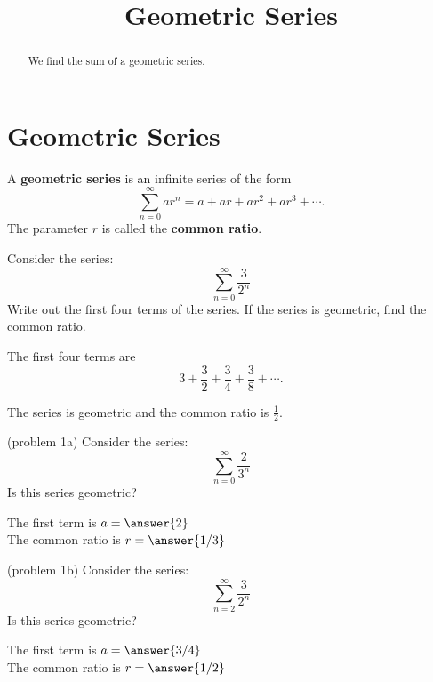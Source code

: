 \documentclass{ximera}
\title{Geometric Series}
\begin{document}
\begin{abstract}
We find the sum of a geometric series.
\end{abstract}

\maketitle

\section{Geometric Series}

\begin{definition} A \textbf{geometric series} is an infinite series of the form
\[
\sum_{n=0}^\infty ar^n = a + ar + ar^2 + ar^3 + \cdots.
\]
The parameter $r$ is called the \textbf{common ratio}.
\end{definition}

\begin{example}[example 1]
Consider the series:
\[
 \sum_{n=0}^\infty \frac{3}{2^n} 
 \]
 Write out the first four terms of the series. If the series is geometric, find the common ratio.
 
 The first four terms are \[
 3 + \frac32 + \frac34 + \frac38 + \cdots.
 \]

 The series is geometric and the common ratio is $\frac12$.
 \end{example}
 
 

\begin{problem}(problem 1a)
 Consider the series:
 \[
 \sum_{n=0}^\infty \frac{2}{3^n} 
 \]
 Is this series geometric?
 \begin{multipleChoice}
 \end{multipleChoice}
 
 The first term is $a = \answer{2}$\\
 The common ratio is $r = \answer{1/3}$
 \end{problem}
 
 
 \begin{problem}(problem 1b)
 Consider the series:
 \[
 \sum_{n=2}^\infty \frac{3}{2^n} 
 \]
 Is this series geometric?
 \begin{multipleChoice}
 \end{multipleChoice}
 
 The first term is $a = \answer{3/4}$\\
 The common ratio is $r = \answer{1/2}$
 \end{problem}
 
\end{document}
